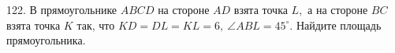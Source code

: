 122. В прямоугольнике $ABCD$ на стороне $AD$ взята точка $L,$ а на стороне $BC$ взята точка $K$ так, что $KD=DL=KL=6,\ \angle ABL=45^\circ.$ Найдите площадь прямоугольника.\\
